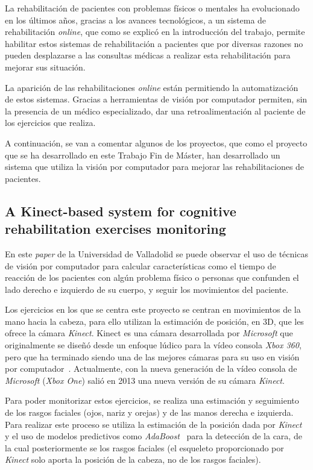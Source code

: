 
La rehabilitación de pacientes con problemas físicos o mentales ha evolucionado en los últimos años, gracias a los avances tecnológicos, a un sistema de rehabilitación \textit{online}, que como se explicó en la introducción del trabajo, permite habilitar estos sistemas de rehabilitación a pacientes que por diversas razones no pueden desplazarse a las consultas médicas a realizar esta rehabilitación para mejorar sus situación.

La aparición de las rehabilitaciones \textit{online} están permitiendo la automatización de estos sistemas. Gracias a herramientas de visión por computador permiten, sin la presencia de un médico especializado, dar una retroalimentación al paciente de los ejercicios que realiza.

A continuación, se van a comentar algunos de los proyectos, que como el proyecto que se ha desarrollado en este Trabajo Fin de Máster, han desarrollado un sistema que utiliza la visión por computador para mejorar las rehabilitaciones de pacientes.

\subsection{A Kinect-based system for cognitive rehabilitation exercises monitoring~\cite{kinectbasedsystem}}
En este \textit{paper} de la Universidad de Valladolid se puede observar el uso de técnicas de visión por computador para calcular características como el tiempo de reacción de los pacientes con algún problema físico o personas que confunden el lado derecho e izquierdo de su cuerpo, y seguir los movimientos del paciente.

Los ejercicios en los que se centra este proyecto se centran en movimientos de la mano hacia la cabeza, para ello utilizan la estimación de posición, en 3D, que les ofrece la cámara \textit{Kinect}. Kinect es una cámara desarrollada por \textit{Microsoft} que originalmente se diseñó desde un enfoque lúdico para la vídeo consola \textit{Xbox 360}, pero que ha terminado siendo una de las mejores cámaras para su uso en visión por computador~\cite{wiki:kinect}. Actualmente, con la nueva generación de la vídeo consola de \textit{Microsoft} (\textit{Xbox One}) salió en 2013 una nueva versión de su cámara \textit{Kinect}.

Para poder monitorizar estos ejercicios, se realiza una estimación y seguimiento de los rasgos faciales (ojos, nariz y orejas) y de las manos derecha e izquierda. Para realizar este proceso se utiliza la estimación de la posición dada por \textit{Kinect} y el uso de modelos predictivos como \textit{AdaBoost}~\cite{ada} para la detección de la cara, de la cual posteriormente se los rasgos faciales (el esqueleto proporcionado por \textit{Kinect} solo aporta la posición de la cabeza, no de los rasgos faciales).

